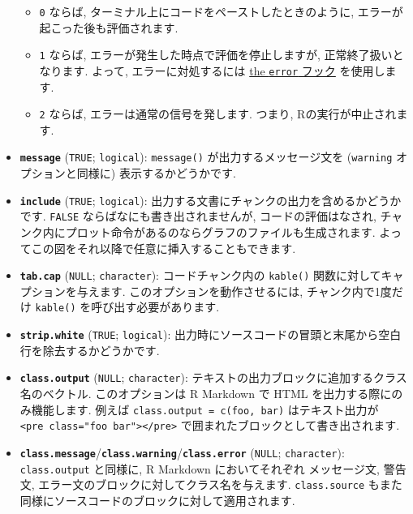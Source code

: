 \documentclass[
  lualatex,ja=standard,jafont=noto-otf]{bxjsreport}
\providecommand{\tightlist}{%
  \setlength{\itemsep}{0pt}\setlength{\parskip}{0pt}}
\begin{document}
\begin{itemize}
  \begin{itemize}
  \tightlist
  \item
    \texttt{0} ならば, ターミナル上にコードをペーストしたときのように,
    エラーが起こった後も評価されます.
  \item
    \texttt{1} ならば, エラーが発生した時点で評価を停止しますが,
    正常終了扱いとなります. よって, エラーに対処するには
    \href{hooks/\#output-hooks}{the \texttt{error} フック} を使用します.
  \item
    \texttt{2} ならば, エラーは通常の信号を発します. つまり,
    Rの実行が中止されます.
  \end{itemize}
\item
  \textbf{\texttt{message}} (\texttt{TRUE}; \texttt{logical}):
  \texttt{message()} が出力するメッセージ文を (\texttt{warning}
  オプションと同様に) 表示するかどうかです.
\item
  \textbf{\texttt{include}} (\texttt{TRUE}; \texttt{logical}):
  出力する文書にチャンクの出力を含めるかどうかです. \texttt{FALSE}
  ならばなにも書き出されませんが, コードの評価はなされ,
  チャンク内にプロット命令があるのならグラフのファイルも生成されます.
  よってこの図をそれ以降で任意に挿入することもできます.
\item
  \textbf{\texttt{tab.cap}} (\texttt{NULL}; \texttt{character}):
  コードチャンク内の \texttt{kable()}
  関数に対してキャプションを与えます. このオプションを動作させるには,
  チャンク内で1度だけ \texttt{kable()} を呼び出す必要があります.
\item
  \textbf{\texttt{strip.white}} (\texttt{TRUE}; \texttt{logical}):
  出力時にソースコードの冒頭と末尾から空白行を除去するかどうかです.
\item
  \textbf{\texttt{class.output}} (\texttt{NULL}; \texttt{character}):
  テキストの出力ブロックに追加するクラス名のベクトル. このオプションは R
  Markdown で HTML を出力する際にのみ機能します. 例えば
  \texttt{class.output\ =\ c(\textquotesingle{}foo\textquotesingle{},\ \textquotesingle{}bar\textquotesingle{})}
  はテキスト出力が
  \texttt{\textless{}pre\ class="foo\ bar"\textgreater{}\textless{}/pre\textgreater{}}
  で囲まれたブロックとして書き出されます.
\item
  \textbf{\texttt{class.message}}/\textbf{\texttt{class.warning}}/\textbf{\texttt{class.error}}
  (\texttt{NULL}; \texttt{character}): \texttt{class.output} と同様に, R
  Markdown においてそれぞれ メッセージ文, 警告文,
  エラー文のブロックに対してクラス名を与えます. \texttt{class.source}
  もまた同様にソースコードのブロックに対して適用されます.

\end{itemize}
\end{document}
